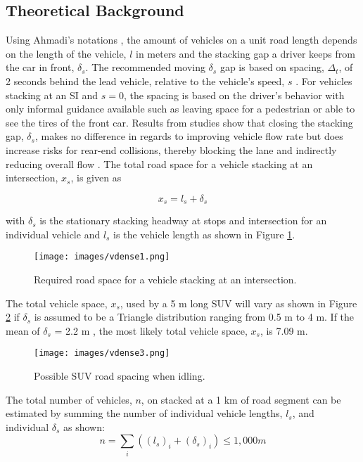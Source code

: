 \documentclass[preprint,12pt,a4paper]{elsarticle}
\begin{document}
\begin{linenumbers}
\section{Theoretical Background}

Using Ahmadi's notations \citep{Ahmadi2017}, the amount of vehicles on a unit road length depends on the length of the vehicle, $l$ in meters and the stacking gap a driver keeps from the car in front, $\delta_{s}$.  The recommended moving $\delta_{s}$ gap is based on spacing, $\Delta_{t}$, of 2 seconds behind the lead vehicle, relative to the vehicle's speed, $s$ \citep{NYDMV2015, ukdot2017}.  For vehicles stacking at an SI and $s=0$, the spacing is based on the driver's behavior with only informal guidance available such as leaving space for a pedestrian or able to see the tires of the front car. Results from studies show that closing the stacking gap, $\delta_{s}$, makes no difference in regards to improving vehicle flow rate but does increase risks for rear-end collisions, thereby blocking the lane and indirectly reducing overall flow \citep{Ahmadi2017}. The total road space for a vehicle stacking at an intersection, $x_{s}$, is given as

\begin{equation}
\label{eq:roadspace}
x_{s}= l_{s} +\delta_{s}
\end{equation}

\noindent
with $\delta_{s}$ is the stationary stacking headway at stops and intersection for an individual vehicle and $l_{s}$ is the vehicle length as shown in Figure \ref{fig1:roadspace}.

\begin{figure}[H]
\centering
\texttt{[image: images/vdense1.png]} 
\caption{Required road space for a vehicle stacking at an intersection.}
\label{fig1:roadspace}
\end{figure}
%
 The total vehicle space, $x_{s}$, used by a 5 m long SUV will vary as shown in Figure \ref{fig3:SUVspace} if $\delta_{s}$ is assumed to be a Triangle distribution ranging from 0.5 m to 4 m.  If  the mean of $\delta_{s}$ = 2.2 m , the most likely total vehicle space, $x_{s}$,  is  7.09 m.
%
\begin{figure}[H]
\centering
\texttt{[image: images/vdense3.png]} 
\caption{Possible SUV road spacing when idling.}
\label{fig3:SUVspace}
\end{figure}
%
The total number of vehicles, $n$, on stacked at a 1 km of road segment can be estimated by summing the number of individual vehicle lengths, $l_{s}$, and individual $\delta_{s}$ as shown:
% 
\begin{equation}
\label{eq1:roadspace}
n = \sum_{i}\left ({(l_{s})_{i} +(\delta_{s})_{i}} \right )\leq 1,000 m 
\end{equation}
%


\end{linenumbers}
\end{document}
